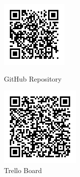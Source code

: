\documentclass[a4paper, 12pt]{article}
\begin{document}
      \begin{figure}[h]
        \centering
        \begin{minipage}[t]{0.45\textwidth}
          \centering
          \includegraphics[width=0.8\linewidth]{../../GlobalImages/github-QR-code.png}
          \caption{GitHub Repository}
        \end{minipage}
        \hfill
        \begin{minipage}[t]{0.45\textwidth}
          \centering
          \includegraphics[width=0.8\linewidth]{../../GlobalImages/trello-QR-code.png}
          \caption{Trello Board}
        \end{minipage}
      \end{figure}
\end{document}
